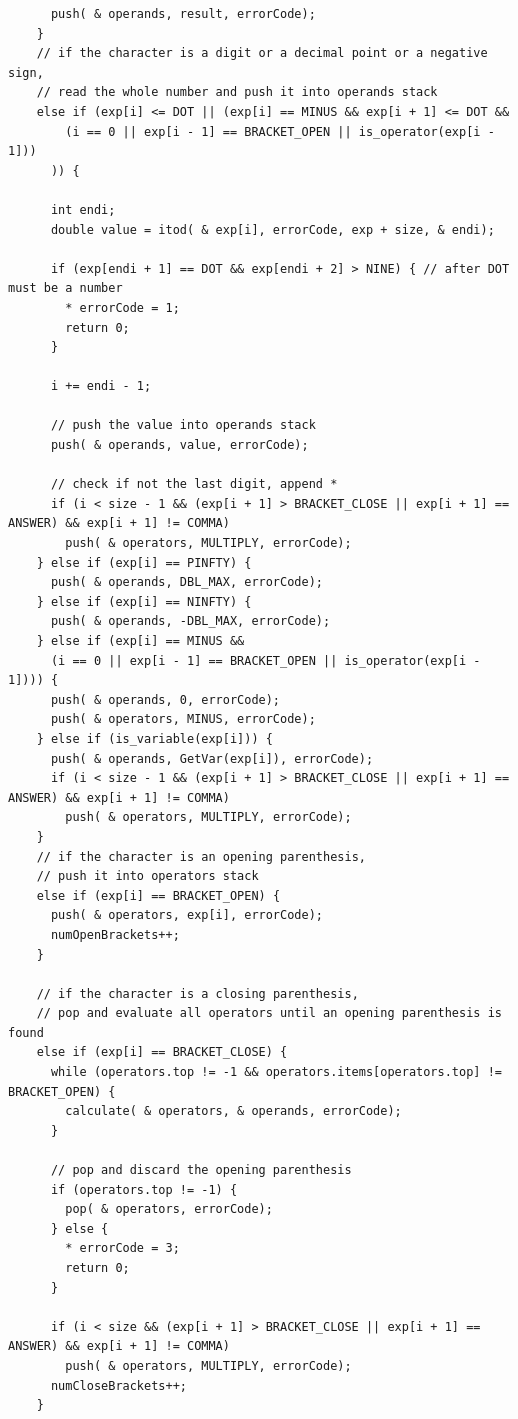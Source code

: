 \documentclass[a4paper, twoside]{report}
\begin{document}
\begin{verbatim}
      push( & operands, result, errorCode);
    }
    // if the character is a digit or a decimal point or a negative sign,
    // read the whole number and push it into operands stack
    else if (exp[i] <= DOT || (exp[i] == MINUS && exp[i + 1] <= DOT &&
        (i == 0 || exp[i - 1] == BRACKET_OPEN || is_operator(exp[i - 1]))
      )) {

      int endi;
      double value = itod( & exp[i], errorCode, exp + size, & endi);

      if (exp[endi + 1] == DOT && exp[endi + 2] > NINE) { // after DOT must be a number
        * errorCode = 1;
        return 0;
      }

      i += endi - 1;

      // push the value into operands stack
      push( & operands, value, errorCode);

      // check if not the last digit, append *
      if (i < size - 1 && (exp[i + 1] > BRACKET_CLOSE || exp[i + 1] == ANSWER) && exp[i + 1] != COMMA)
        push( & operators, MULTIPLY, errorCode);
    } else if (exp[i] == PINFTY) {
      push( & operands, DBL_MAX, errorCode);
    } else if (exp[i] == NINFTY) {
      push( & operands, -DBL_MAX, errorCode);
    } else if (exp[i] == MINUS &&
      (i == 0 || exp[i - 1] == BRACKET_OPEN || is_operator(exp[i - 1]))) {
      push( & operands, 0, errorCode);
      push( & operators, MINUS, errorCode);
    } else if (is_variable(exp[i])) {
      push( & operands, GetVar(exp[i]), errorCode);
      if (i < size - 1 && (exp[i + 1] > BRACKET_CLOSE || exp[i + 1] == ANSWER) && exp[i + 1] != COMMA)
        push( & operators, MULTIPLY, errorCode);
    }
    // if the character is an opening parenthesis,
    // push it into operators stack
    else if (exp[i] == BRACKET_OPEN) {
      push( & operators, exp[i], errorCode);
      numOpenBrackets++;
    }

    // if the character is a closing parenthesis,
    // pop and evaluate all operators until an opening parenthesis is found
    else if (exp[i] == BRACKET_CLOSE) {
      while (operators.top != -1 && operators.items[operators.top] != BRACKET_OPEN) {
        calculate( & operators, & operands, errorCode);
      }

      // pop and discard the opening parenthesis
      if (operators.top != -1) {
        pop( & operators, errorCode);
      } else {
        * errorCode = 3;
        return 0;
      }

      if (i < size && (exp[i + 1] > BRACKET_CLOSE || exp[i + 1] == ANSWER) && exp[i + 1] != COMMA)
        push( & operators, MULTIPLY, errorCode);
      numCloseBrackets++;
    }


\end{verbatim}
\end{document}
